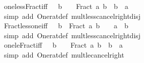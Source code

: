 \begin{isabellebody}
\endisatagproof
{\isafoldproof}%
%
\isadelimproof
\isanewline
%
\endisadelimproof
\isanewline
{}\isamarkupfalse%
\ one{\isacharunderscore}{\kern0pt}less{\isacharunderscore}{\kern0pt}Fract{\isacharunderscore}{\kern0pt}iff{\isacharcolon}{\kern0pt}\ {\isachardoublequoteopen}{}\ {\isacharless}{\kern0pt}\ b\ {\isasymLongrightarrow}\ {}\ {\isacharless}{\kern0pt}\ Fract\ a\ b\ {\isasymlongleftrightarrow}\ b\ {\isacharless}{\kern0pt}\ a{\isachardoublequoteclose}\isanewline
%
\isadelimproof
\ \ %
\endisadelimproof
%
\isatagproof
{}\isamarkupfalse%
\ {\isacharparenleft}{\kern0pt}simp\ add{\isacharcolon}{\kern0pt}\ One{\isacharunderscore}{\kern0pt}rat{\isacharunderscore}{\kern0pt}def\ mult{\isacharunderscore}{\kern0pt}less{\isacharunderscore}{\kern0pt}cancel{\isacharunderscore}{\kern0pt}right{\isacharunderscore}{\kern0pt}disj{\isacharparenright}{\kern0pt}%
\endisatagproof
{\isafoldproof}%
%
\isadelimproof
\isanewline
%
\endisadelimproof
\isanewline
{}\isamarkupfalse%
\ Fract{\isacharunderscore}{\kern0pt}less{\isacharunderscore}{\kern0pt}one{\isacharunderscore}{\kern0pt}iff{\isacharcolon}{\kern0pt}\ {\isachardoublequoteopen}{}\ {\isacharless}{\kern0pt}\ b\ {\isasymLongrightarrow}\ Fract\ a\ b\ {\isacharless}{\kern0pt}\ {}\ {\isasymlongleftrightarrow}\ a\ {\isacharless}{\kern0pt}\ b{\isachardoublequoteclose}\isanewline
%
\isadelimproof
\ \ %
\endisadelimproof
%
\isatagproof
{}\isamarkupfalse%
\ {\isacharparenleft}{\kern0pt}simp\ add{\isacharcolon}{\kern0pt}\ One{\isacharunderscore}{\kern0pt}rat{\isacharunderscore}{\kern0pt}def\ mult{\isacharunderscore}{\kern0pt}less{\isacharunderscore}{\kern0pt}cancel{\isacharunderscore}{\kern0pt}right{\isacharunderscore}{\kern0pt}disj{\isacharparenright}{\kern0pt}%
\endisatagproof
{\isafoldproof}%
%
\isadelimproof
\isanewline
%
\endisadelimproof
\isanewline
{}\isamarkupfalse%
\ one{\isacharunderscore}{\kern0pt}le{\isacharunderscore}{\kern0pt}Fract{\isacharunderscore}{\kern0pt}iff{\isacharcolon}{\kern0pt}\ {\isachardoublequoteopen}{}\ {\isacharless}{\kern0pt}\ b\ {\isasymLongrightarrow}\ {}\ {\isasymle}\ Fract\ a\ b\ {\isasymlongleftrightarrow}\ b\ {\isasymle}\ a{\isachardoublequoteclose}\isanewline
%
\isadelimproof
\ \ %
\endisadelimproof
%
\isatagproof
{}\isamarkupfalse%
\ {\isacharparenleft}{\kern0pt}simp\ add{\isacharcolon}{\kern0pt}\ One{\isacharunderscore}{\kern0pt}rat{\isacharunderscore}{\kern0pt}def\ mult{\isacharunderscore}{\kern0pt}le{\isacharunderscore}{\kern0pt}cancel{\isacharunderscore}{\kern0pt}right{\isacharparenright}{\kern0pt}%

\end{isabellebody}
